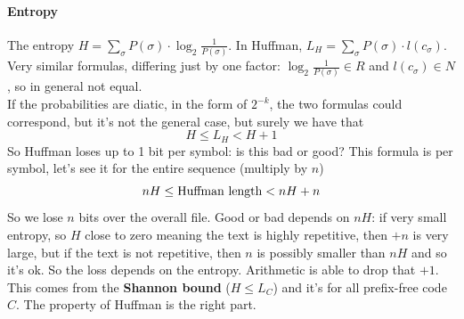\documentclass[10pt]{report}
\begin{document}
\paragraph{Entropy} The entropy $H = \sum_\sigma P(\sigma)\cdot\log_2\frac{1}{P(\sigma)}$. In Huffman, $L_H = \sum_\sigma P(\sigma)\cdot l(c_\sigma)$.\\
Very similar formulas, differing just by one factor: $\log_2\frac{1}{P(\sigma)}\in R$ and $l(c_\sigma)\in N$, so in general not equal.\\
If the probabilities are diatic, in the form of $2^{-k}$, the two formulas could correspond, but it's not the general case, but surely we have that $$H\leq L_H < H + 1$$ So Huffman loses up to 1 bit per symbol: is this bad or good? This formula is per symbol, let's see it for the entire sequence (multiply by $n$)
$$nH\leq \hbox{Huffman length} < nH + n$$ So we lose $n$ bits over the overall file. Good or bad depends on $nH$: if very small entropy, so $H$ close to zero meaning the text is highly repetitive, then $+n$ is very large, but if the text is not repetitive, then $n$ is possibly smaller than $nH$ and so it's ok. So the loss depends on the entropy. Arithmetic is able to drop that $+1$.\\
This comes from the \textbf{Shannon bound} ($H\leq L_C$) and it's for all prefix-free code $C$. The property of Huffman is the right part.
\end{document}
